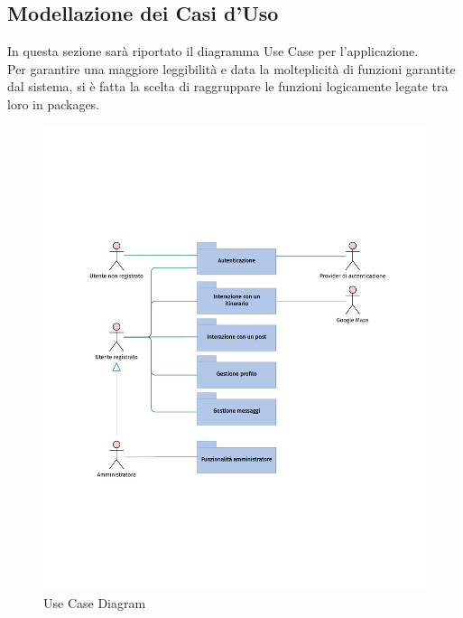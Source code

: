\documentclass{natourDoc}
\begin{document}
\newpage

\newpage
\subsection{Modellazione dei Casi d'Uso}
In questa sezione sarà riportato il diagramma Use Case per l'applicazione.\\
Per garantire una maggiore leggibilità e data la molteplicità di funzioni garantite
dal sistema, si è fatta la scelta di raggruppare le funzioni logicamente legate
tra loro in packages.

\begin{figure}[!htbp]
	\centering
	\includegraphics[width=\textwidth, page=1]{./diagrams/useCase.pdf}
	\caption{Use Case Diagram}
\end{figure}
\FloatBarrier

\newpage
\end{document}
